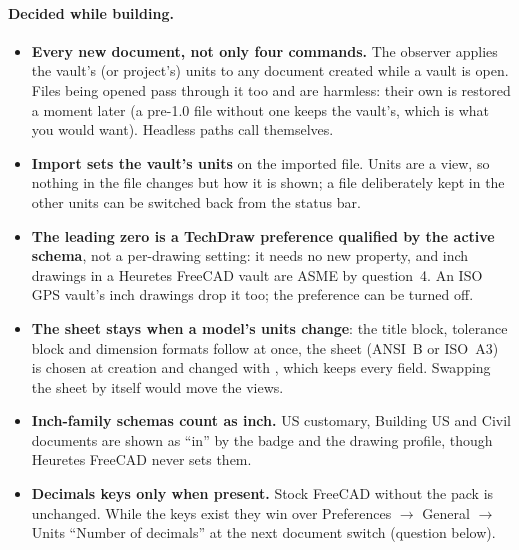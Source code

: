 \paragraph{Decided while building.}
\begin{itemize}[nosep]
  \item \textbf{Every new document, not only four commands.} The observer applies the vault's (or project's)
        units to any document created while a vault is open. Files being opened pass through it too and are
        harmless: their own  is restored a moment later (a pre-1.0 file without one keeps
        the vault's, which is what you would want). Headless paths call  themselves.
  \item \textbf{Import sets the vault's units} on the imported file. Units are a view, so nothing in the
        file changes but how it is shown; a file deliberately kept in the other units can be switched back
        from the status bar.
  \item \textbf{The leading zero is a TechDraw preference qualified by the active schema}, not a per-drawing
        setting: it needs no new property, and inch drawings in a Heuretes FreeCAD vault are ASME by question~4.
        An ISO GPS vault's inch drawings drop it too; the preference can be turned off.
  \item \textbf{The sheet stays when a model's units change}: the title block, tolerance block and dimension
        formats follow at once, the sheet (ANSI~B or ISO~A3) is chosen at creation and changed with
        , which keeps every field. Swapping the sheet by itself would move the views.
  \item \textbf{Inch-family schemas count as inch.} US customary, Building US and Civil documents are shown
        as ``in'' by the badge and the drawing profile, though Heuretes FreeCAD never sets them.
  \item \textbf{Decimals keys only when present.} Stock FreeCAD without the pack is unchanged. While the keys
        exist they win over Preferences $\rightarrow$ General $\rightarrow$ Units ``Number of decimals'' at the
        next document switch (question below).
\end{itemize}

